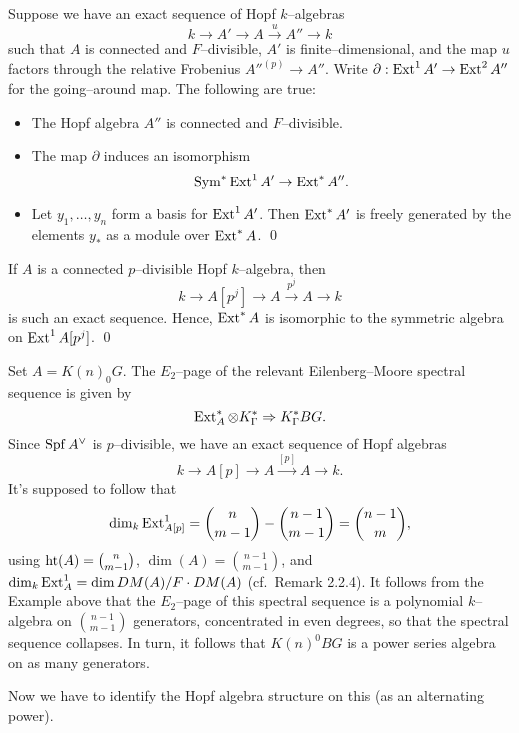 \begin{theorem}
Suppose we have an exact sequence of Hopf $k$--algebras \[k \to A' \to A \xrightarrow{u} A'' \to k\] such that $A$ is connected and $F$--divisible, $A'$ is finite--dimensional, and the map $u$ factors through the relative Frobenius ${A''}^{(p)} \to A''$.  Write $\partial: \operatorname{Ext}^1 A' \to \operatorname{Ext}^2 A''$ for the going--around map.  The following are true:
\begin{itemize}
\item The Hopf algebra $A''$ is connected and $F$--divisible.
\item The map $\partial$ induces an isomorphism \[\operatorname{Sym}^* \operatorname{Ext}^1 A' \to \operatorname{Ext}^* A''.\]
\item Let $y_1, \ldots, y_n$ form a basis for $\operatorname{Ext}^1 A'$.  Then $\operatorname{Ext}^* A'$ is freely generated by the elements $y_*$ as a module over $\operatorname{Ext}^* A$. \qed
\end{itemize}
\end{theorem}

\begin{corollary}
If $A$ is a connected $p$--divisible Hopf $k$--algebra, then \[k \to A[p^j] \to A \xrightarrow{p^j} A \to k\] is such an exact sequence.  Hence, $\operatorname{Ext}^* A$ is isomorphic to the symmetric algebra on $\operatorname{Ext}^1 A[p^j]$.  \qed
\end{corollary}

 Set $A = K(n)_0 G$.  The $E_2$--page of the relevant Eilenberg--Moore spectral sequence is given by \[\operatorname{Ext}_A^* \otimes K_\Gamma^* \Rightarrow K_\Gamma^* BG.\]  Since $\operatorname{Spf} A^\vee$ is $p$--divisible, we have an exact sequence of Hopf algebras \[k \to A[p] \to A \xrightarrow{[p]} A \to k.\]  It's supposed to follow that \[\dim_k \operatorname{Ext}^1_{A[p]} = \binom{n}{m-1} - \binom{n-1}{m-1} = \binom{n-1}{m},\] using $\operatorname{ht}(A) = \binom{n}{m-1}$, $\dim(A) = \binom{n-1}{m-1}$, and $\dim_k \operatorname{Ext}^1_A = \dim DM(A) / F \cdot DM(A)$ (cf.\ Remark 2.2.4).  It follows from the Example above that the $E_2$--page of this spectral sequence is a polynomial $k$--algebra on $\binom{n-1}{m-1}$ generators, concentrated in even degrees, so that the spectral sequence collapses.  In turn, it follows that $K(n)^0 BG$ is a power series algebra on as many generators.

 Now we have to identify the Hopf algebra structure on this (as an alternating power).

